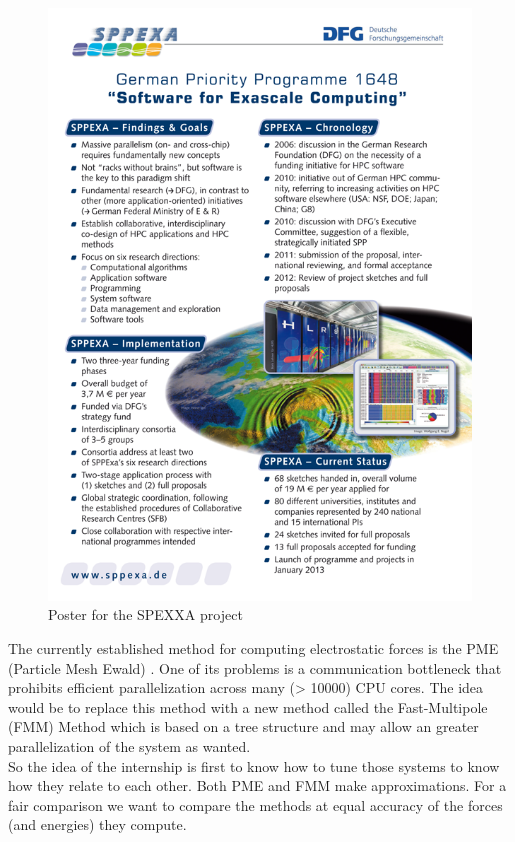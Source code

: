 \documentclass[11pt,twoside,a4paper]{report}
\begin{document}
\begin{figure}[H]
\includegraphics[scale=2]{sppexa-poster}
 \centering 
\caption{Poster for the SPEXXA project}
\label{fig:poster}
\end{figure}


The currently established method for computing electrostatic forces is the PME (Particle Mesh Ewald) \cite{darden1993particle}. One of its problems is a communication bottleneck that prohibits efficient parallelization across many (> 10000) CPU cores. The idea would be to replace this method with a new method called the Fast-Multipole (FMM) Method which is based on a tree structure and may allow an greater parallelization of the system as wanted.\\

So the idea of the internship is first to know how to tune those systems to know how they relate to each other. Both PME and FMM make approximations. For a fair comparison we want to compare the methods at equal accuracy of the forces (and energies) they compute. 
\end{document}
